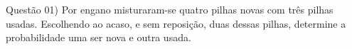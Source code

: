 
\noindent \textcolor{COLOR1}{Questão 01)} Por engano misturaram-se quatro pilhas novas com três pilhas usadas. Escolhendo ao acaso, e sem  reposição, duas dessas pilhas, determine a probabilidade uma ser nova e outra usada.
\\